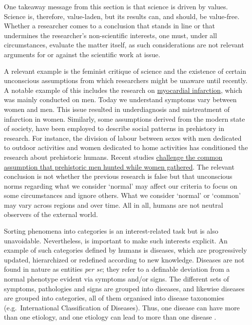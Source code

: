 \documentclass[
]{book}
\begin{document}
One takeaway message from this section is that science is driven by values. Science is, therefore, value-laden, but its results can, and should, be value-free. Whether a researcher comes to a conclusion that stands in line or that undermines the researcher's non-scientific interests, one must, under all circumstances, evaluate the matter itself, as such considerations are not relevant arguments for or against the scientific work at issue.

A relevant example is the feminist critique of science \citep{sep-feminist-science} and the existence of certain unconscious assumptions from which researchers might be unaware until recently. A notable example of this includes the research on \href{https://en.wikipedia.org/wiki/Cardiovascular_disease_in_women\#History}{myocardial infarction}, which was mainly conducted on men. Today we understand symptoms vary between women and men. This issue resulted in underdiagnosis and mistreatment of infarction in women. Similarly, some assumptions derived from the modern state of society, have been employed to describe social patterns in prehistory in research. For instance, the division of labour between sexes with men dedicated to outdoor activities and women dedicated to home activities has conditioned the research about prehistoric humans. Recent studies \href{https://www.nationalgeographic.com/science/article/prehistoric-female-hunter-discovery-upends-gender-role-assumptions}{challenge the common assumption that prehistoric men hunted while women gathered}. The relevant conclusion is not whether the previous research is false but that unconscious norms regarding what we consider `normal' may affect our criteria to focus on some circumstances and ignore others. What we consider `normal' or `common' may vary across regions and over time. All in all, humans are not neutral observers of the external world.

Sorting phenomena into categories is an interest-related task \citep{johansson2016philosophy} but is also unavoidable. Nevertheless, is important to make such interests explicit. An example of such categories defined by humans is diseases, which are progressively updated, hierarchized or redefined according to new knowledge. Diseases are not found in nature as entities \emph{per se}; they refer to a definable deviation from a normal phenotype evident via symptoms and/or signs. The different sets of symptoms, pathologies and signs are grouped into diseases, and likewise diseases are grouped into categories, all of them organised into disease taxonomies (e.g.~International Classification of Diseases). Thus, one disease can have more than one etiology, and one etiology can lead to more than one disease \citep{vega2021hume}.
\end{document}
